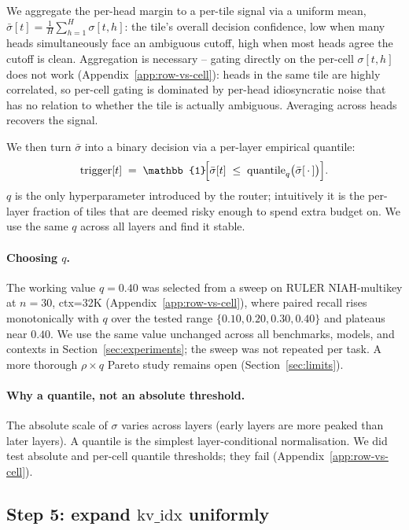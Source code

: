 \documentclass[11pt]{article}
\theoremstyle{remark}
\begin{document}
We aggregate the per-head margin to a per-tile signal via a uniform mean, $\bar\sigma[t] = \frac{1}{H}\sum_{h=1}^{H} \sigma[t,h]$: the tile's overall decision confidence, low when many heads simultaneously face an ambiguous cutoff, high when most heads agree the cutoff is clean. Aggregation is necessary -- gating directly on the per-cell $\sigma[t,h]$ does not work (Appendix~\ref{app:row-vs-cell}): heads in the same tile are highly correlated, so per-cell gating is dominated by per-head idiosyncratic noise that has no relation to whether the tile is actually ambiguous. Averaging across heads recovers the signal.

We then turn $\bar\sigma$ into a binary decision via a per-layer empirical quantile:
\begin{equation}\label{eq:trigger}
\text{trigger}[t] \;=\; \mathbb{1}\!\Bigl[\bar\sigma[t] \;\le\; \operatorname{quantile}_q\bigl(\bar\sigma[\,\cdot\,]\bigr)\Bigr].
\end{equation}
$q$ is the only hyperparameter introduced by the router; intuitively it is the per-layer fraction of tiles that are deemed risky enough to spend extra budget on. We use the same $q$ across all layers and find it stable.

\paragraph{Choosing $q$.} The working value $q = 0.40$ was selected from a sweep on RULER NIAH-multikey at $n=30$, ctx=32K (Appendix~\ref{app:row-vs-cell}), where paired recall rises monotonically with $q$ over the tested range $\{0.10, 0.20, 0.30, 0.40\}$ and plateaus near $0.40$. We use the same value unchanged across all benchmarks, models, and contexts in Section~\ref{sec:experiments}; the sweep was not repeated per task. A more thorough $\rho \times q$ Pareto study remains open (Section~\ref{sec:limits}).

\paragraph{Why a quantile, not an absolute threshold.} The absolute scale of $\sigma$ varies across layers (early layers are more peaked than later layers). A quantile is the simplest layer-conditional normalisation. We did test absolute and per-cell quantile thresholds; they fail (Appendix~\ref{app:row-vs-cell}).

\subsection{Step 5: expand $\text{kv\_idx}$ uniformly}
\end{document}
